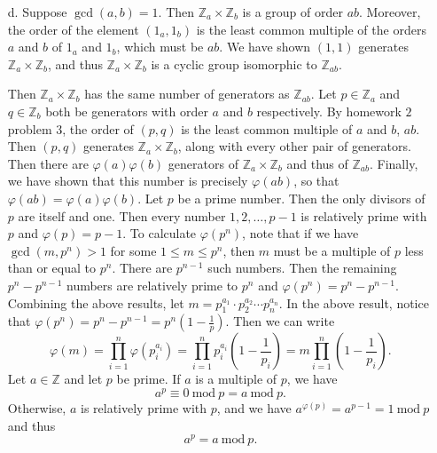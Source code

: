 \documentclass[11pt, reqno]{article}
\theoremstyle{plain}
\theoremstyle{definition}
\theoremstyle{remark}
\renewcommand{\phi}{\varphi}
\newcommand{\ZZ}{\mathbb{Z}}
\begin{document}
\begin{enumerate}
\begin{enumerate}
        \item[d.] Suppose $\gcd(a,b) = 1$. Then $\ZZ_a \times \ZZ_b$ is a group of order $ab$. Moreover,
        the order of the element $(1_a,1_b)$ is the least common multiple of the orders $a$ and $b$
        of $1_a$ and $1_b$, which must be $ab$. We have shown $(1,1)$ generates $\ZZ_a \times \ZZ_b$, and 
        thus $\ZZ_a \times \ZZ_b$ is a cyclic group isomorphic to $\ZZ_{ab}$. 

        Then $\ZZ_a \times \ZZ_b$ has the same number of generators as $\ZZ_{ab}$. Let $p \in \ZZ_a$
        and $q \in \ZZ_b$ both be generators with order $a$ and $b$ respectively. By homework $2$ problem 
        $3$, the order of $(p,q)$ is the least common multiple of $a$ and $b$, $ab$. Then $(p,q)$ generates
        $\ZZ_a \times \ZZ_b$, along with every other pair of generators. Then there are $\phi(a)\phi(b)$
        generators of $\ZZ_a \times \ZZ_b$ and thus of $\ZZ_{ab}$. Finally, we have shown that this 
        number is precisely $\phi(ab)$, so that $\phi(ab) = \phi(a)\phi(b)$.
        \bigbreak 
        Let $p$ be a prime number. Then the only divisors of $p$ are itself and one. Then 
        every number $1, 2, \dots, p-1$ is relatively prime with $p$ and $\phi(p) = p-1$.
        \bigbreak
        To calculate $\phi(p^n)$, note that if we have $\gcd(m, p^n) > 1$ for some $1 \leq m \leq p^n$, then $m$ must be 
        a multiple of $p$ less than or equal to $p^n$. There are $p^{n-1}$ such numbers. 
        Then the remaining $p^n - p^{n-1}$ numbers are relatively prime to $p^n$ and $\phi(p^n) = p^n - p^{n-1}$.
        \bigbreak 
        Combining the above results, let $m = p_1^{a_1}\cdot p_2^{a_2}\cdots p_n^{a_n}$. In the above
        result, notice that $\phi(p^n) = p^n - p^{n-1} = p^n(1 - \frac{1}{p})$. Then we can write 
        \[
            \phi(m) = \prod_{i = 1}^n \phi(p_i^{a_i}) = \prod_{i = 1}^n p_i^{a_i} (1 - \frac{1}{p_i}) = m \prod_{i = 1}^n (1 - \frac{1}{p_i}).
        \]
        \bigbreak
        Let $a \in \ZZ$ and let $p$ be prime. If $a$ is a multiple of $p$, we have 
        \[
            a^p \equiv 0\ \text{mod}\ p = a\ \text{mod}\ p.
        \]
        Otherwise, $a$ is relatively prime with $p$, and we have $a^{\phi(p)} = a^{p - 1} = 1\ \text{mod}\ p$ and thus 
        \[
            a^p = a\ \text{mod}\ p.
        \]

    \end{enumerate}
\end{enumerate}
\end{document}
